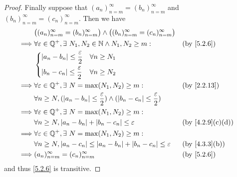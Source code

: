 \begin{proof}
  Finally suppose that \((a_n)_{n = m}^\infty = (b_n)_{n = m}^\infty\) and \((b_n)_{n = m}^\infty = (c_n)_{n = m}^\infty\).
  Then we have
  \begin{align*}
             & \big((a_n)_{n = m}^\infty = (b_n)_{n = m}^\infty\big) \land \big((b_n)_{n = m}^\infty = (c_n)_{n = m}^\infty\big)                                       \\
    \implies & \forall \varepsilon \in \Q^+, \exists\ N_1, N_2 \in \N \land N_1, N_2 \geq m:                                       &  & \by{5.2.6}                     \\
             & \begin{dcases}
                 \abs{a_n - b_n} \leq \dfrac{\varepsilon}{2} & \forall n \geq N_1 \\
                 \abs{b_n - c_n} \leq \dfrac{\varepsilon}{2} & \forall n \geq N_2 \\
               \end{dcases}                                                                                        \\
    \implies & \forall \varepsilon \in \Q^+, \exists\ N = \max(N_1, N_2) \geq m:                                                   &  & \text{(by \cref{2.2.13})}      \\
             & \forall n \geq N, (\abs{a_n - b_n} \leq \dfrac{\varepsilon}{2}) \land (\abs{b_n - c_n} \leq \dfrac{\varepsilon}{2})                                     \\
    \implies & \forall \varepsilon \in \Q^+, \exists\ N = \max(N_1, N_2) \geq m:                                                                                       \\
             & \forall n \geq N, \abs{a_n - b_n} + \abs{b_n - c_n} \leq \varepsilon                                                &  & \text{(by \cref{4.2.9}(c)(d))} \\
    \implies & \forall \varepsilon \in \Q^+, \exists\ N = \max(N_1, N_2) \geq m:                                                                                       \\
             & \forall n \geq N, \abs{a_n - c_n} \leq \abs{a_n - b_n} + \abs{b_n - c_n} \leq \varepsilon                           &  & \text{(by \cref{4.3.3}(b))}    \\
    \implies & (a_n)_{n = m}^\infty = (c_n)_{n = m}^\infty                                                                         &  & \by{5.2.6}
  \end{align*}
  and thus \cref{5.2.6} is transitive.
\end{proof}

